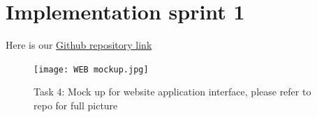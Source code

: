 \documentclass[a4paper]{article}
\begin{document}
\section{Implementation sprint 1}
Here is our \href{https://github.com/chymchym1905/SE-221/}{Github repository link}\\



\begin{figure}
\centering
  \texttt{[image: WEB mockup.jpg]}
    \caption{Task 4: Mock up for website application interface, please refer to repo for full picture}
\end{figure}


\begin{thebibliography}{80}

\end{thebibliography}
\end{document}
